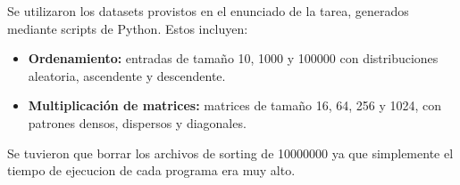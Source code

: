 Se utilizaron los datasets provistos en el enunciado de la tarea, generados mediante scripts de Python. Estos incluyen:

\begin{itemize}
    \item \textbf{Ordenamiento:} entradas de tamaño 10, 1000 y 100000 con distribuciones aleatoria, ascendente y descendente.
    \item \textbf{Multiplicación de matrices:} matrices de tamaño 16, 64, 256 y 1024, con patrones densos, dispersos y diagonales.
\end{itemize}

Se tuvieron que borrar los archivos de sorting de 10000000 ya que simplemente el tiempo de ejecucion de cada programa era muy alto. 
